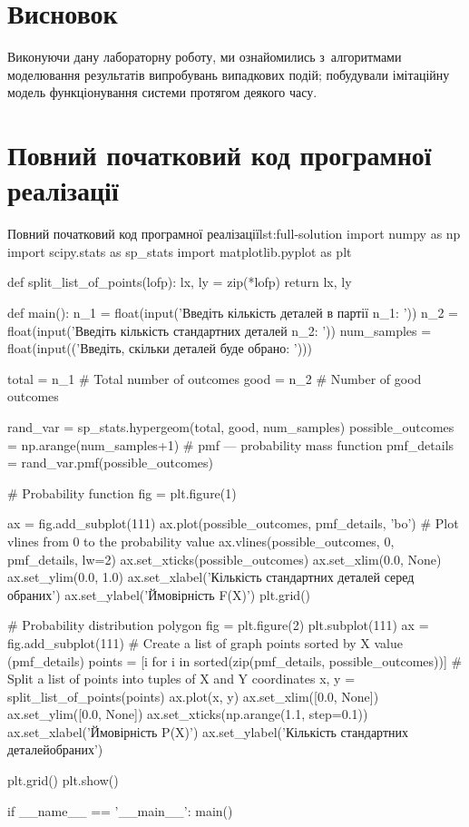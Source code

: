 \documentclass[
	a4paper,
	oneside,
	BCOR = 10mm,
	DIV = 12,
	12pt,
	headings = normal,
]{scrartcl}
\begin{document}
		\section{Висновок}
			Виконуючи дану лабораторну роботу, ми ознайомились з~алгоритмами моделювання результатів випробувань випадкових подій; побудували імітаційну модель функціонування системи протягом деякого часу.

		\appendix
		\section{Повний початковий код програмної реалізації}
		\label{sec:full-listing}
			\begin{listingpython}[toprule = 0pt, bottomrule = 0pt]{Повний початковий код програмної реалізації}{lst:full-solution}
import numpy as np
import scipy.stats as sp_stats
import matplotlib.pyplot as plt


def split_list_of_points(lofp):
    lx, ly = zip(*lofp)
    return lx, ly


def main():
    n_1 = float(input('Введіть кількість деталей в партії n_1: '))
    n_2 = float(input('Введіть кількість стандартних деталей n_2: '))
    num_samples = float(input(('Введіть, скільки деталей буде обрано: ')))

    total = n_1  # Total number of outcomes
    good = n_2   # Number of good outcomes

    rand_var = sp_stats.hypergeom(total, good, num_samples)
    possible_outcomes = np.arange(num_samples+1)
    # pmf --- probability mass function
    pmf_details = rand_var.pmf(possible_outcomes)

    # Probability function
    fig = plt.figure(1)

    ax = fig.add_subplot(111)
    ax.plot(possible_outcomes, pmf_details, 'bo')
    # Plot vlines from 0 to the probability value
    ax.vlines(possible_outcomes, 0, pmf_details, lw=2)
    ax.set_xticks(possible_outcomes)
    ax.set_xlim(0.0, None)
    ax.set_ylim(0.0, 1.0)
    ax.set_xlabel('Кількість стандартних деталей серед обраних')
    ax.set_ylabel('Ймовірність F(X)')
    plt.grid()

    # Probability distribution polygon
    fig = plt.figure(2)
    plt.subplot(111)
    ax = fig.add_subplot(111)
    # Create a list of graph points sorted by X value (pmf_details)
    points = [i for i in sorted(zip(pmf_details, possible_outcomes))]
    # Split a list of points into tuples of X and Y coordinates
    x, y = split_list_of_points(points)
    ax.plot(x, y)
    ax.set_xlim([0.0, None])
    ax.set_ylim([0.0, None])
    ax.set_xticks(np.arange(1.1, step=0.1))
    ax.set_xlabel('Ймовірність P(X)')
    ax.set_ylabel('Кількість стандартних деталей обраних')

    plt.grid()
    plt.show()


if __name__ == '__main__':
    main()
			\end{listingpython}
\end{document}
